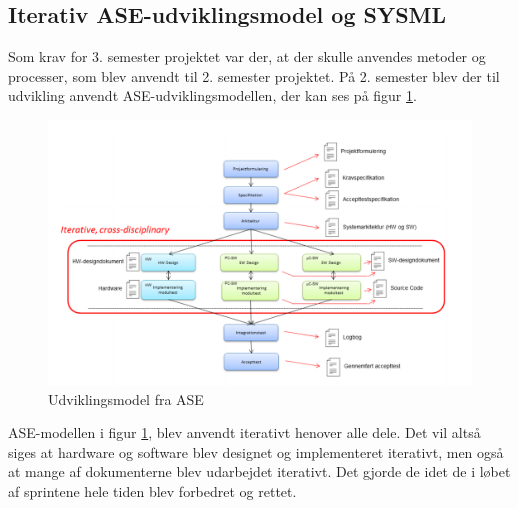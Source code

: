 \documentclass[Rapport/Rapport_main.tex]{subfiles}
\begin{document}
\subsection{Iterativ ASE-udviklingsmodel og SYSML}
Som krav for 3. semester projektet var der, at der skulle anvendes metoder og processer, som blev anvendt til 2. semester projektet. På 2. semester blev der til udvikling anvendt ASE-udviklingsmodellen, der kan ses på figur \ref{fig:rap_ase_model}.
\begin{figure}[H]
    \centering
    \includegraphics[width=\textwidth]{Processdokument/graphics/ASE_model.png}
    \caption{Udviklingsmodel fra ASE \cite{vejledning_prj3}}
    \label{fig:rap_ase_model}
\end{figure}
ASE-modellen i figur \ref{fig:rap_ase_model}, blev anvendt iterativt henover alle dele. Det vil altså siges at hardware og software blev designet og implementeret iterativt, men også at mange af dokumenterne blev udarbejdet iterativt. Det gjorde de idet de i løbet af sprintene hele tiden blev forbedret og rettet.\\\\
\end{document}
